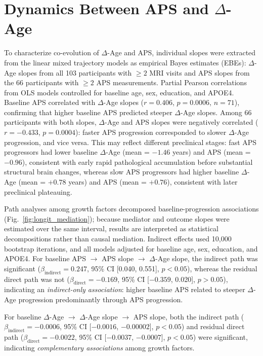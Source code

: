 \documentclass[conference]{IEEEtran}
\begin{document}
\section{Dynamics Between APS and $\Delta$-Age}\label{res3}

To characterize co-evolution of $\Delta$-Age and APS, individual slopes were extracted from the linear mixed trajectory models as empirical Bayes estimates (EBEs): $\Delta$-Age slopes from all 103 participants with $\geq 2$ MRI visits and APS slopes from the 66 participants with $\geq 2$ APS measurements. Partial Pearson correlations from OLS models controlled for baseline age, sex, education, and APOE4. Baseline APS correlated with $\Delta$-Age slopes ($r = 0.406$, $p = 0.0006$, $n = 71$), confirming that higher baseline APS predicted steeper $\Delta$-Age slopes. Among 66 participants with both slopes, $\Delta$-Age and APS slopes were negatively correlated ($r = -0.433$, $p = 0.0004$): faster APS progression corresponded to slower $\Delta$-Age progression, and vice versa. This may reflect different preclinical stages: fast APS progressors had lower baseline $\Delta$-Age (mean = $-1.46$ years) and APS (mean = $-0.96$), consistent with early rapid pathological accumulation before substantial structural brain changes, whereas slow APS progressors had higher baseline $\Delta$-Age (mean = $+0.78$ years) and APS (mean = $+0.76$), consistent with later preclinical plateauing.

Path analyses among growth factors decomposed baseline-progression associations (Fig.~\ref{fig:longit_mediation}); because mediator and outcome slopes were estimated over the same interval, results are interpreted as statistical decompositions rather than causal mediation. Indirect effects used 10,000 bootstrap iterations, and all models adjusted for baseline age, sex, education, and APOE4. For baseline APS $\rightarrow$ APS slope $\rightarrow$ $\Delta$-Age slope, the indirect path was significant ($\beta_{\text{indirect}} = 0.247$, 95\% CI [0.040, 0.551], $p < 0.05$), whereas the residual direct path was not ($\beta_{\text{direct}} = -0.169$, 95\% CI [$-0.359$, 0.020], $p > 0.05$), indicating an \emph{indirect-only association}: higher baseline APS related to steeper $\Delta$-Age progression predominantly through APS progression.

For baseline $\Delta$-Age $\rightarrow$ $\Delta$-Age slope $\rightarrow$ APS slope, both the indirect path ($\beta_{\text{indirect}} = -0.0006$, 95\% CI [$-0.0016$, $-0.00002$], $p < 0.05$) and residual direct path ($\beta_{\text{direct}} = -0.0022$, 95\% CI [$-0.0037$, $-0.0007$], $p < 0.05$) were significant, indicating \emph{complementary associations} among growth factors.
\end{document}
